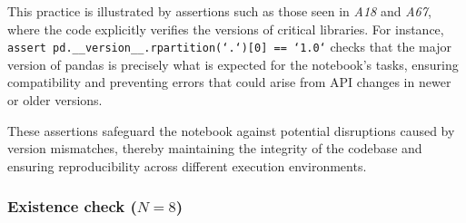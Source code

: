 This practice is illustrated by assertions such as those seen in \emph{A18} and \emph{A67}, where the code explicitly verifies the versions of critical libraries. For instance, \texttt{assert pd.\_\_version\_\_.rpartition(`.`)[0] == `1.0`} checks that the major version of pandas is precisely what is expected for the notebook’s tasks, ensuring compatibility and preventing errors that could arise from API changes in newer or older versions.

These assertions safeguard the notebook against potential disruptions caused by version mismatches, thereby maintaining the integrity of the codebase and ensuring reproducibility across different execution environments.

\subsubsection{Existence check ($N = 8$)}

